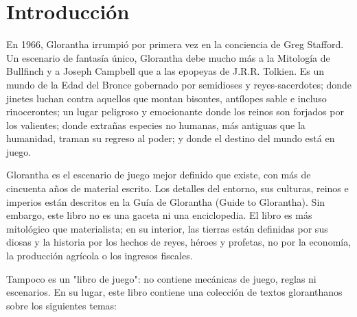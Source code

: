 \chapter{Introducción} %
\label{cha:introduccion} %

En 1966, Glorantha irrumpió por primera vez en la conciencia de Greg Stafford. Un escenario de fantasía único, Glorantha debe mucho más a la Mitología de Bullfinch y a Joseph Campbell que a las epopeyas de J.R.R. Tolkien. Es un mundo de la Edad del Bronce gobernado por semidioses y reyes-sacerdotes; donde jinetes luchan contra aquellos que montan bisontes, antílopes sable e incluso rinocerontes; un lugar peligroso y emocionante donde los reinos son forjados por los valientes; donde extrañas especies no humanas, más antiguas que la humanidad, traman su regreso al poder; y donde el destino del mundo está en juego.

Glorantha es el escenario de juego mejor definido que existe, con más de cincuenta años de material escrito. Los detalles del entorno, sus culturas, reinos e imperios están descritos en la Guía de Glorantha (Guide to Glorantha). Sin embargo, este libro no es una gaceta ni una enciclopedia. El libro es más mitológico que materialista; en su interior, las tierras están definidas por sus diosas y la historia por los hechos de reyes, héroes y profetas, no por la economía, la producción agrícola o los ingresos fiscales.

Tampoco es un "libro de juego": no contiene mecánicas de juego, reglas ni escenarios. En su lugar, este libro contiene una colección de textos gloranthanos sobre los siguientes temas:


